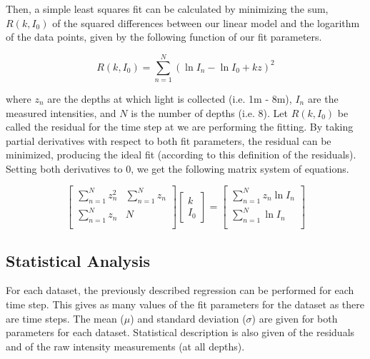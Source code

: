 \documentclass{article}
\begin{document}
Then, a simple least squares fit can be calculated by minimizing the sum, $R(k,I_0)$ of the squared differences between our linear model and the logarithm of the data points, given by the following function of our fit parameters.

\begin{equation}
	R(k,I_0) = \sum_{n=1}^N (\ln I_n - \ln I_0 + kz)^2
	\label{resid}
\end{equation}

where $z_n$ are the depths at which light is collected (i.e. 1m - 8m), $I_n$ are the measured intensities, and $N$ is the number of depths (i.e. 8). Let $R(k,I_0)$ be called the residual for the time step at we are performing the fitting. By taking partial derivatives with respect to both fit parameters, the residual can be minimized, producing the ideal fit (according to this definition of the residuals). Setting both derivatives to 0, we get the following matrix system of equations.

\newcommand\xls{z_n}
\newcommand\yls{\ln I_n}
\begin{equation}
	\renewcommand\arraystretch{3}
	\begin{bmatrix}
		\sum_{n=1}^N \xls^2 & \sum_{n=1}^N \xls \\
		\sum_{n=1}^N \xls   & N \\
	\end{bmatrix}
%
	\begin{bmatrix}
		k \\
		I_0
	\end{bmatrix}
%
	=
%
	\begin{bmatrix}
		\sum_{n=1}^N \xls\yls \\
		\sum_{n=1}^N \yls \\
	\end{bmatrix}
	\label{lstsq}
\end{equation}

\subsection{Statistical Analysis}
\label{stats}
For each dataset, the previously described regression can be performed for each time step. This gives as many values of the fit parameters for the dataset as there are time steps. The mean ($\mu$) and standard deviation ($\sigma$) are given for both parameters for each dataset. Statistical description is also given of the residuals and of the raw intensity measurements (at all depths). \\
\end{document}

